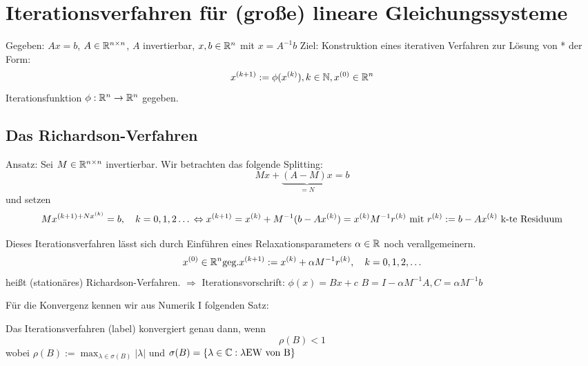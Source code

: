 \chapter{Iterationsverfahren für (große) lineare Gleichungssysteme}
Gegeben: $Ax=b$, $A\in \mathbb{R}^{n\times n}$, $A$ invertierbar, $x,b \in \mathbb{R}^n$ mit $x=A^{-1}b$
Ziel: Konstruktion eines iterativen Verfahren zur Lösung von * der Form:
\begin{equation}
  x^{(k+1)} := \phi(x^{(k)}), k\in \mathbb{N}, x^{(0)} \in \mathbb{R}^n
  \label{}
\end{equation}
Iterationsfunktion $\phi: \mathbb{R}^n \to \mathbb{R}^n$ gegeben.

\section{Das Richardson-Verfahren}
Ansatz: Sei $M\in \mathbb{R}^{n\times n}$ invertierbar. Wir betrachten das folgende Splitting:
\begin{equation}
  Mx + \underbrace{(A-M)x}_{=N}= b
  \label{}
\end{equation}
und setzen 
\begin{equation}
  Mx^{(k+1) + Nx^{(k)}} = b,\quad k=0,1,2\dots\\
  \Leftrightarrow x^{(k+1)} = x^{(k)} + M^{-1}(b-Ax^{(k)})
  = x^{(k)} M^{-1}r^{(k)} \text{ mit } r^{(k)} := b-Ax^{(k)} \text{ k-te Residuum} %
  \label{}
\end{equation}

Dieses Iterationsverfahren lässt sich durch Einführen eines Relaxationsparameters $\alpha \in \mathbb{R}$ noch verallgemeinern.
\begin{equation}
  x^{(0)} \in \R^n \text{geg.}
  x^{(k+1)} := x^{(k)} + \alpha M^{-1} r^{(k)},\quad k=0,1,2,\dots
  \label{Iterationsverfahren}
\end{equation}
heißt (stationäres) Richardson-Verfahren. 
$\Rightarrow$ Iterationsvorschrift: $\phi(x) = Bx + c$ $B=I-\alpha M^{-1}A, C=\alpha M^{-1}b$

Für die Konvergenz kennen wir aus Numerik I folgenden Satz:

\begin{satz}
  \label{itkonvergenz}
  Das Iterationsverfahren (label) konvergiert genau dann, wenn 
  \begin{equation}
    \rho (B) < 1 
    \label{}
  \end{equation}
  wobei $\rho(B) := \max_{\lambda \in \sigma(B)} |\lambda|$ und $\sigma(B) = \left\{ \lambda\in \mathbb{C}: \lambda \text{EW von B} \right\}$
\end{satz}

